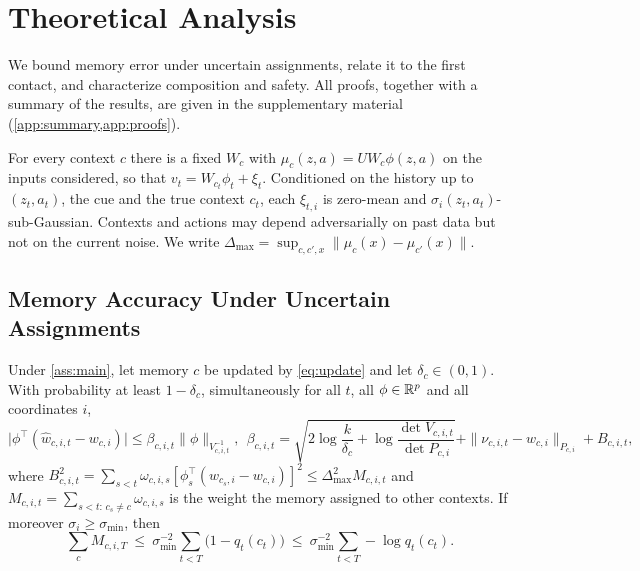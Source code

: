 \section{Theoretical Analysis}\label{sec:analysis}

We bound memory error under uncertain assignments, relate it to the first contact, and characterize composition and safety. All proofs, together with a summary of the results, are given in the supplementary material (\cref{app:summary,app:proofs}).

\begin{assumption}\label{ass:main}
For every context $c$ there is a fixed $W_c$ with $\mu_c(z,a)=UW_c\phi(z,a)$ on the inputs considered, so that $v_t=W_{c_t}\phi_t+\xi_t$. Conditioned on the history up to $(z_t,a_t)$, the cue and the true context $c_t$, each $\xi_{t,i}$ is zero-mean and $\sigma_i(z_t,a_t)$-sub-Gaussian. Contexts and actions may depend adversarially on past data but not on the current noise. We write $\Delta_{\max}=\sup_{c,c',x}\|\mu_c(x)-\mu_{c'}(x)\|$.
\end{assumption}

\subsection{Memory Accuracy Under Uncertain Assignments}

\begin{theorem}\label{thm:confidence}
Under \cref{ass:main}, let memory $c$ be updated by \cref{eq:update} and let $\delta_c\in(0,1)$. With probability at least $1-\delta_c$, simultaneously for all $t$, all $\phi\in\mathbb{R}^p$ and all coordinates $i$,
\begin{equation}\label{eq:thm-conf}
  \big|\phi^\top(\widehat w_{c,i,t}-w_{c,i})\big|\le\beta_{c,i,t}\|\phi\|_{V^{-1}_{c,i,t}},\ \ 
  \beta_{c,i,t}=\textstyle\sqrt{2\log\frac{k}{\delta_c}+\log\frac{\det V_{c,i,t}}{\det P_{c,i}}}
  +\|\nu_{c,i,t}-w_{c,i}\|_{P_{c,i}}+B_{c,i,t},
\end{equation}
where $B^2_{c,i,t}=\sum_{s<t}\omega_{c,i,s}[\phi_s^\top(w_{c_s,i}-w_{c,i})]^2\le\Delta_{\max}^2M_{c,i,t}$ and $M_{c,i,t}=\sum_{s<t:\,c_s\neq c}\omega_{c,i,s}$ is the weight the memory assigned to other contexts. If moreover $\sigma_i\ge\sigma_{\min}$, then
\begin{equation}\label{eq:contam-logloss}
  \textstyle\sum_c M_{c,i,T}\ \le\ \sigma_{\min}^{-2}\sum_{t<T}\big(1-q_t(c_t)\big)\ \le\ \sigma_{\min}^{-2}\sum_{t<T}-\log q_t(c_t).
\end{equation}
\end{theorem}

